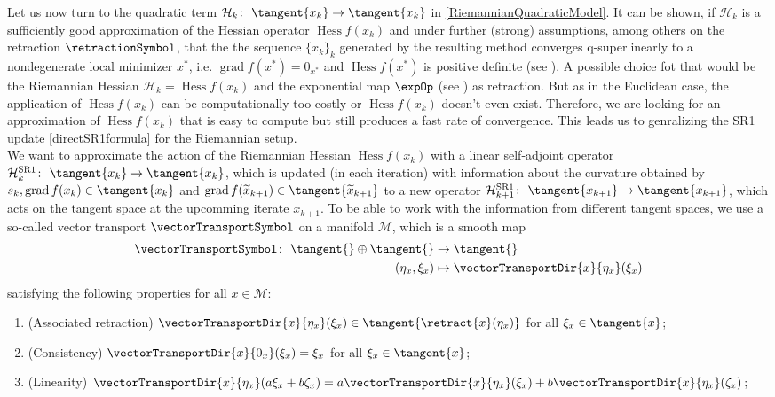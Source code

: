 Let us now turn to the quadratic term $\mathcal{H}_k \colon \ \tangent{x_k} \to \tangent{x_k}$ in \cref{RiemannianQuadraticModel}. It can be shown, if $\mathcal{H}_k$ is a sufficiently good approximation of the Hessian operator $\operatorname{Hess} f(x_k)$ and under further (strong) assumptions, among others on the retraction $\retractionSymbol$, that the the sequence $\{ x_k \}_k$ generated by the resulting method converges q-superlinearly to a nondegenerate local minimizer $x^*$, i.e. $\operatorname{grad} f(x^*) = 0_{x^*}$ and $\operatorname{Hess} f(x^*)$ is positive definite (see \cite[Theorem~7.4.11]{AbsilMahonySepulchre:2008}). A possible choice fot that would be the Riemannian Hessian $\mathcal{H}_k = \operatorname{Hess} f(x_k)$ and the exponential map $\expOp$ (see \cite[p.~102]{AbsilMahonySepulchre:2008}) as retraction. But as in the Euclidean case, the application of $\operatorname{Hess} f(x_k)$ can be computationally too costly or $\operatorname{Hess} f(x_k)$ doesn't even exist. Therefore, we are looking for an approximation of $\operatorname{Hess} f(x_k)$ that is easy to compute but still produces a fast rate of convergence. This leads us to genralizing the SR1 update \cref{directSR1formula} for the Riemannian setup. \\
We want to approximate the action of the Riemannian Hessian $\operatorname{Hess} f(x_k)$ with a linear self-adjoint operator $\mathcal{H}^\mathrm{SR1}_k \colon \ \tangent{x_k} \to \tangent{x_k}$, which is updated (in each iteration) with information about the curvature obtained by $s_k, \operatorname{grad} f(x_k) \in \tangent{x_k}$ and $\operatorname{grad} f(\widetilde{x}_{k+1}) \in \tangent{\widetilde{x}_{k+1}}$ to a new operator $\mathcal{H}^\mathrm{SR1}_{k+1} \colon \ \tangent{x_{k+1}} \to \tangent{x_{k+1}}$, which acts on the tangent space at the upcomming iterate $x_{k+1}$. To be able to work with the information from different tangent spaces, we use a so-called vector transport $\vectorTransportSymbol$ on a manifold $\mathcal{M}$, which is a smooth map 
\begin{align*}
    \vectorTransportSymbol \colon \ \tangent{} \oplus \tangent{} & \to \tangent{} \\
    (\eta_x, \xi_x) & \mapsto \vectorTransportDir{x}{\eta_x}(\xi_x)
\end{align*}      
satisfying the following properties for all $x \in \mathcal{M}$:
\begin{enumerate}
    \item (Associated retraction) $\vectorTransportDir{x}{\eta_x}(\xi_x) \in \tangent{\retract{x}(\eta_x)}$ for all $\xi_x \in \tangent{x}$;
    \item (Consistency) $\vectorTransportDir{x}{0_x}(\xi_x) = \xi_x$ for all $\xi_x \in \tangent{x}$;
    \item (Linearity) $\vectorTransportDir{x}{\eta_x}(a \xi_x + b \zeta_x) = a \vectorTransportDir{x}{\eta_x}(\xi_x) + b \vectorTransportDir{x}{\eta_x}(\zeta_x)$;
\end{enumerate}
